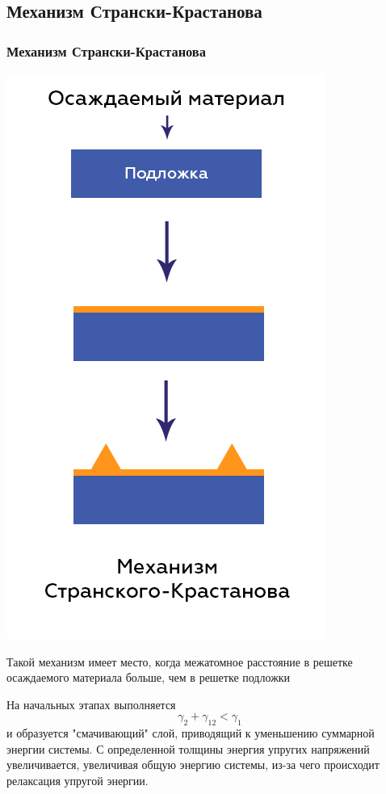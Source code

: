 \documentclass[10pt,pdf,hyperref={unicode}, dvipsnames]{beamer}
\begin{document}
\subsection{Механизм Странски-Крастанова}
\begin{frame}[t]
	\frametitle{Механизм Странски-Крастанова}
	\begin{minipage}{0.4\linewidth}
		\includegraphics[width = \linewidth]{imgs/SKM.png}
	\end{minipage}	
	\begin{minipage}{0.59\linewidth}
		Такой механизм имеет место, когда межатомное расстояние в решетке осаждаемого материала больше, чем в решетке подложки

		На начальных этапах выполняется $$ \gamma_2+\gamma_{12}<\gamma_1 $$ и образуется "смачивающий"  слой, приводящий к уменьшению суммарной энергии системы. С определенной
		толщины энергия упругих напряжений увеличивается, увеличивая общую энергию системы, из-за чего происходит релаксация упругой энергии.
	\end{minipage}
\end{frame}
\end{document}
